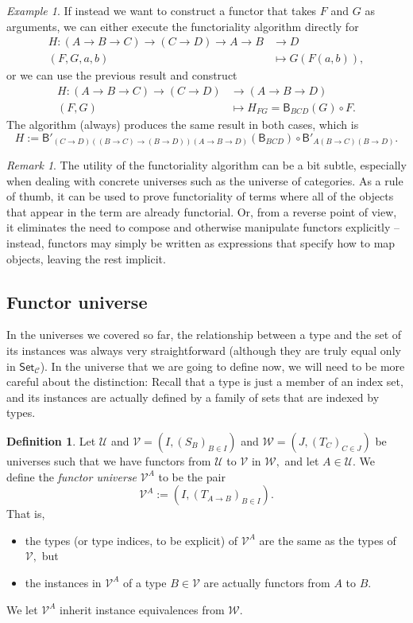 \documentclass[a4paper]{article}
\theoremstyle{definition}
\newtheorem{definition}{Definition}[section]
\theoremstyle{remark}
\newtheorem*{remark}{Remark}
\newtheorem*{example}{Example}
\newcommand{\defn}{\emph}
\newcommand{\C}{\mathcal{C}}
\newcommand{\U}{\mathcal{U}}
\newcommand{\V}{\mathcal{V}}
\newcommand{\W}{\mathcal{W}}
\newcommand{\nm}{\mathsf}
\newcommand{\universe}{\nm}
\newcommand{\Set}{\universe{Set}}
\newcommand{\combinator}{\nm}
\newcommand{\compFun}{\combinator{B'}}
\newcommand{\revCompFun}{\combinator{B}}
\begin{document}
\begin{example}
  If instead we want to construct a functor that takes $F$ and $G$ as
  arguments, we can either execute the functoriality algorithm directly for
  \begin{align*}
    H : (A \to B \to C) \to (C \to D) \to A \to B &\to     D\\
        (F,G,a,b)                                 &\mapsto G(F(a,b)),
  \end{align*}
  or we can use the previous result and construct
  \begin{align*}
    H : (A \to B \to C) \to (C \to D) &\to     (A \to B \to D)\\
        (F,G)                         &\mapsto H_{FG} = \revCompFun_{BCD}(G) \circ F.
  \end{align*}
  The algorithm (always) produces the same result in both cases, which is
  \[H := \compFun_{(C{\to}D)((B{\to}C){\to}(B{\to}D))(A{\to}B{\to}D)}(\revCompFun_{BCD}) \circ \compFun_{A(B{\to}C)(B{\to}D)}.\]
\end{example}

\begin{remark}
  The utility of the functoriality algorithm can be a bit subtle, especially when dealing
  with concrete universes such as the universe of categories. As a rule of thumb, it can
  be used to prove functoriality of terms where all of the objects that appear in the term
  are already functorial. Or, from a reverse point of view, it eliminates the need to
  compose and otherwise manipulate functors explicitly -- instead, functors may simply be
  written as expressions that specify how to map objects, leaving the rest implicit.
\end{remark}

\subsection{Functor universe}
\label{sec:functor-universe}

In the universes we covered so far, the relationship between a type and the set of its
instances was always very straightforward (although they are truly equal only in $\Set_\C$).
In the universe that we are going to define now, we will need to be more careful about the
distinction: Recall that a type is just a member of an index set, and its instances are
actually defined by a family of sets that are indexed by types.

\begin{definition}
  Let $\U$ and $\V = (I, (S_B)_{B \in I})$ and $\W = (J, (T_C)_{C \in J})$ be universes
  such that we have functors from $\U$ to $\V$ in $\W,$ and let $A \in \U.$
  We define the \defn{functor universe} $\V^A$ to be the pair
  \[\V^A := (I, (T_{A \to B})_{B \in I}).\]
  That is,
  \begin{itemize}
    \item the types (or type indices, to be explicit) of $\V^A$ are the same as the types
          of $\V,$ but
    \item the instances in $\V^A$ of a type $B \in \V$ are actually functors from $A$ to $B.$
  \end{itemize}
  We let $\V^A$ inherit instance equivalences from $\W.$
\end{definition}
\end{document}
